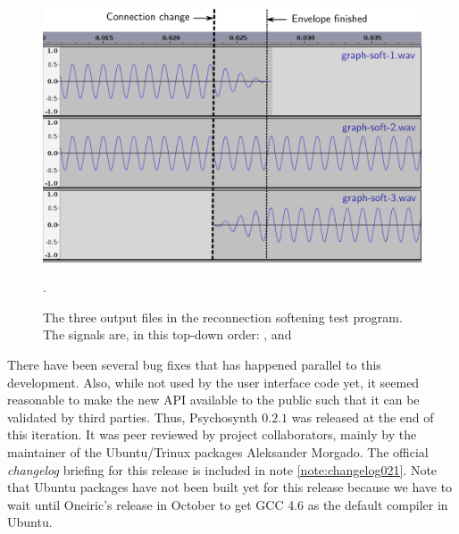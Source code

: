 \begin{figure}[h!]
  \centering
  \includegraphics[width=\textwidth]{pic/sound-vis.pdf}
  \caption[The three output files in the reconnection softening test
  program.]{The three output files in the reconnection softening test
    program. The signals are, in this top-down order:
    ,  and
    }.
  \label{fig:soft-audacity}
\end{figure}

There have been several bug fixes that has happened parallel to this
development. Also, while not used by the user interface code yet, it
seemed reasonable to make the new API available to the public such
that it can be validated by third parties. Thus, Psychosynth $0.2.1$
was released at the end of this iteration. It was 
peer reviewed by project collaborators, mainly by the maintainer of
the Ubuntu/Trinux packages Aleksander Morgado. The official
\emph{changelog} briefing for this release is included in note
\ref{note:changelog021}. Note that Ubuntu packages
have not been built yet for this release because we have to wait until
Oneiric's release in October to get GCC 4.6 as the default compiler in
Ubuntu.

